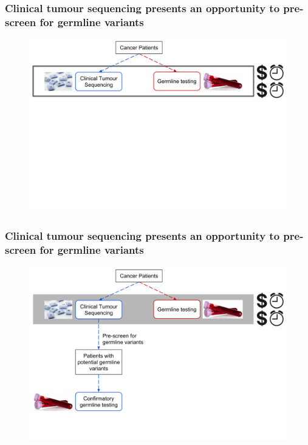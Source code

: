 \documentclass{beamer}
\begin{document}
\begin{frame}
\frametitle{Clinical tumour sequencing presents an opportunity to pre-screen for germline variants}
\vspace{-6mm}
\begin{figure}[t]
    \includegraphics[scale=0.2]{opportunity_clinical_sequencing3a.png}
\end{figure}
\end{frame}

\begin{frame}
\frametitle{Clinical tumour sequencing presents an opportunity to pre-screen for germline variants}
\vspace{-6mm}
\begin{figure}[t]
    \includegraphics[scale=0.2]{opportunity_clinical_sequencing4a.png}
\end{figure}
\end{frame}
\end{document}
